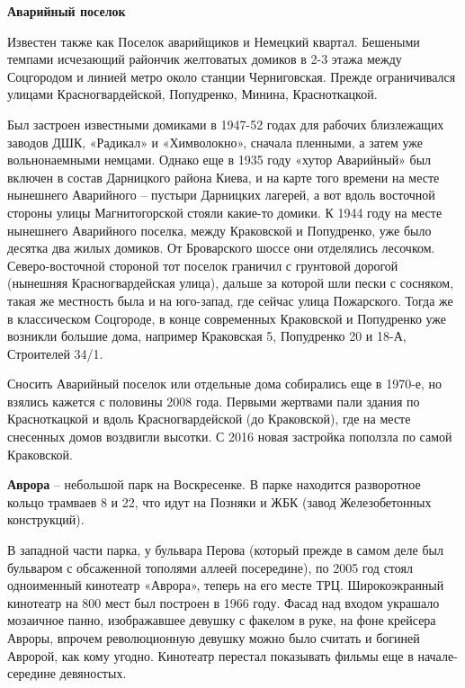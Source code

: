 \medskip

\newpage

\textbf{Аварийный поселок}

Известен также как Поселок аварийщиков и Немецкий квартал. Бешеными темпами исчезающий райончик желтоватых домиков в 2-3 этажа между Соцгородом и линией метро около станции Черниговская. Прежде ограничивался улицами Красногвардейской, Попудренко, Минина, Красноткацкой. 

Был застроен известными домиками в 1947-52 годах для рабочих близлежащих заводов ДШК, «Радикал» и «Химволокно», сначала пленными, а затем уже вольнонаемными немцами. Однако еще в 1935 году «хутор Аварийный» был включен в состав Дарницкого района Киева, и на карте того времени на месте нынешнего Аварийного – пустыри Дарницких лагерей, а вот вдоль восточной стороны улицы Магнитогорской стояли какие-то домики. К 1944 году на месте нынешнего Аварийного поселка, между Краковской и Попудренко, уже было десятка два жилых домиков. От Броварского шоссе они отделялись лесочком. Северо-восточной стороной тот поселок граничил с грунтовой дорогой (нынешняя Красногвардейская улица), дальше за которой шли пески с сосняком, такая же местность была и на юго-запад, где сейчас улица Пожарского. Тогда же в классическом Соцгороде, в конце современных Краковской и Попудренко уже возникли большие дома, например Краковская 5, Попудренко 20 и 18-А, Строителей 34/1.

Сносить Аварийный поселок или отдельные дома собирались еще в 1970-е, но взялись кажется с половины 2008 года. Первыми жертвами пали здания по Красноткацкой и вдоль Красногвардейской (до Краковской), где на месте снесенных домов воздвигли высотки. С 2016 новая застройка поползла по самой Краковской.\\

\medskip

\textbf{Аврора} – небольшой парк на Воскресенке. В парке находится разворотное кольцо трамваев 8 и 22, что идут на Позняки и ЖБК (завод Железобетонных конструкций).

В западной части парка, у бульвара Перова (который прежде в самом деле был бульваром с обсаженной тополями аллеей посередине), по 2005 год стоял одноименный кинотеатр «Аврора», теперь на его месте ТРЦ. Широкоэкранный кинотеатр на 800 мест был построен в 1966 году. Фасад над входом украшало мозаичное панно, изображавшее девушку с факелом в руке, на фоне крейсера Авроры, впрочем революционную девушку можно было считать и богиней Авророй, как кому угодно. Кинотеатр перестал показывать фильмы еще в начале-середине девяностых.

